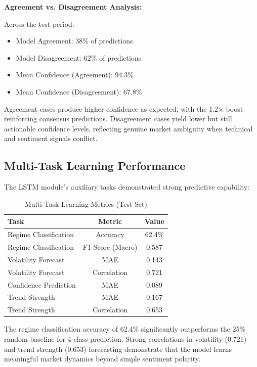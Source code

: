 \documentclass[conference]{IEEEtran}
\begin{document}
\textbf{Agreement vs. Disagreement Analysis:}

Across the test period:
\begin{itemize}
\item Model Agreement: 38\% of predictions
\item Model Disagreement: 62\% of predictions
\item Mean Confidence (Agreement): 94.3\%
\item Mean Confidence (Disagreement): 67.8\%
\end{itemize}

Agreement cases produce higher confidence as expected, with the 1.2× boost reinforcing consensus predictions. Disagreement cases yield lower but still actionable confidence levels, reflecting genuine market ambiguity when technical and sentiment signals conflict.

\subsection{Multi-Task Learning Performance}

The LSTM module's auxiliary tasks demonstrated strong predictive capability:

\begin{table}[htbp]
\centering
\caption{Multi-Task Learning Metrics (Test Set)}
\label{tab:multitask}
\begin{tabular}{lcc}
\toprule
\textbf{Task} & \textbf{Metric} & \textbf{Value} \\
\midrule
Regime Classification & Accuracy & 62.4\% \\
Regime Classification & F1-Score (Macro) & 0.587 \\
Volatility Forecast & MAE & 0.143 \\
Volatility Forecast & Correlation & 0.721 \\
Confidence Prediction & MAE & 0.089 \\
Trend Strength & MAE & 0.167 \\
Trend Strength & Correlation & 0.653 \\
\bottomrule
\end{tabular}
\end{table}

The regime classification accuracy of 62.4\% significantly outperforms the 25\% random baseline for 4-class prediction. Strong correlations in volatility (0.721) and trend strength (0.653) forecasting demonstrate that the model learns meaningful market dynamics beyond simple sentiment polarity.
\end{document}
